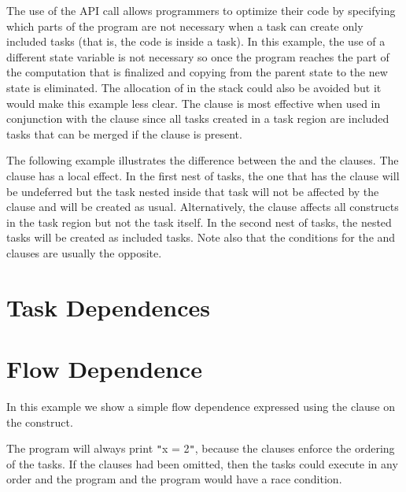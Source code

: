 The use of the  API call allows programmers to optimize 
their code by specifying which parts of the program are not necessary when a task 
can create only included tasks (that is, the code is inside a  task). 
In this example, the use of a different state variable is not necessary so once 
the program reaches the part of the computation that is finalized and copying from 
the parent state to the new state is eliminated. The allocation of  
in the stack could also be avoided but it would make this example less clear. The 
 clause is most effective when used in conjunction with the  
clause since all tasks created in a  task region are included tasks 
that can be merged if the  clause is present.



The following example illustrates the difference between the   and the 
 clauses. The  clause has a local effect. In the first 
nest of tasks, the one that has the   clause will be undeferred but 
the task nested inside that task will not be affected by the  clause 
and will be created as usual. Alternatively, the  clause affects 
all  constructs in the  task region but not the  
task itself. In the second nest of tasks, the nested tasks will be created as included 
tasks. Note also that the conditions for the  and  clauses 
are usually the opposite.



\section*{Task Dependences}

\section{Flow Dependence}

In this example we show a simple flow dependence expressed using the  
clause on the  construct.



The program will always print \texttt{"}x = 2\texttt{"}, because the  
clauses enforce the ordering of the tasks. If the  clauses had been 
omitted, then the tasks could execute in any order and the program and the program 
would have a race condition.


